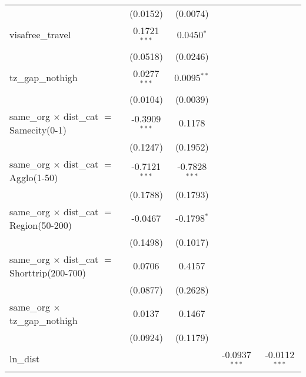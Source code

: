\begin{tabular}{lcccc}
                                                          & (0.0152)        & (0.0074)        &                 &   \\   
   visafree\_travel                                       & 0.1721$^{***}$  & 0.0450$^{*}$    &                 &   \\   
                                                          & (0.0518)        & (0.0246)        &                 &   \\   
   tz\_gap\_nothigh                                       & 0.0277$^{***}$  & 0.0095$^{**}$   &                 &   \\   
                                                          & (0.0104)        & (0.0039)        &                 &   \\   
   same\_org $\times$ dist\_cat $=$ Samecity(0-1)         & -0.3909$^{***}$ & 0.1178          &                 &   \\   
                                                          & (0.1247)        & (0.1952)        &                 &   \\   
   same\_org $\times$ dist\_cat $=$ Agglo(1-50)           & -0.7121$^{***}$ & -0.7828$^{***}$ &                 &   \\   
                                                          & (0.1788)        & (0.1793)        &                 &   \\   
   same\_org $\times$ dist\_cat $=$ Region(50-200)        & -0.0467         & -0.1798$^{*}$   &                 &   \\   
                                                          & (0.1498)        & (0.1017)        &                 &   \\   
   same\_org $\times$ dist\_cat $=$ Shorttrip(200-700)    & 0.0706          & 0.4157          &                 &   \\   
                                                          & (0.0877)        & (0.2628)        &                 &   \\   
   same\_org $\times$ tz\_gap\_nothigh                    & 0.0137          & 0.1467          &                 &   \\   
                                                          & (0.0924)        & (0.1179)        &                 &   \\   
   ln\_dist                                               &                 &                 & -0.0937$^{***}$ & -0.0112$^{***}$\\   

\end{tabular}
